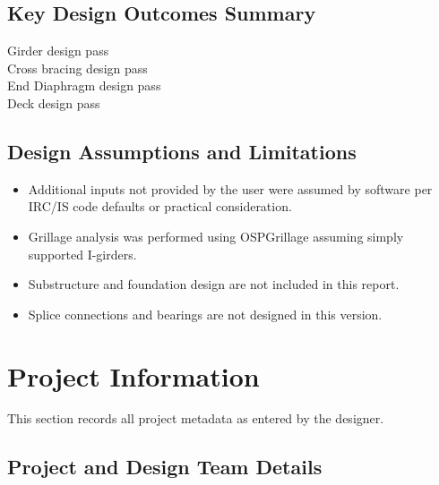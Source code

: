 \documentclass[12pt,a4paper]{report}
\numberwithin{table}{chapter}
\numberwithin{figure}{chapter}
\begin{document}
\vspace{1em}

\section*{Key Design Outcomes Summary}
\label{sec:key-outcomes}

\noindent Girder design pass \\
Cross bracing design pass \\
End Diaphragm design pass \\
Deck design pass

\section*{Design Assumptions and Limitations}
\label{sec:assumptions}

\begin{itemize}
\item Additional inputs not provided by the user were assumed by software per IRC/IS code defaults or practical consideration.
\item Grillage analysis was performed using OSPGrillage assuming simply supported I-girders.
\item Substructure and foundation design are not included in this report.
\item Splice connections and bearings are not designed in this version.
\end{itemize}

\titleformat{\chapter}[block]{\normalfont\Large\bfseries\centering}{\thechapter}{1em}{}
\titlespacing*{\chapter}{0pt}{-30pt}{10pt}


\chapter{Project Information}

This section records all project metadata as entered by the designer.

\section{Project and Design Team Details}
\label{sec:project-details}
\end{document}
